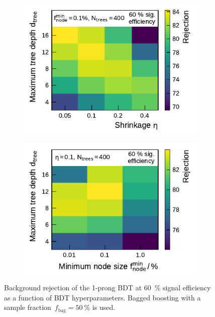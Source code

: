 \begin{figure}[htb]
\begin{subfigure}[t]{0.48\textwidth}
    \includegraphics{./figures/bdt_perf/gridsearch_1p/scan_Shrinkage_MaxDepth.pdf}
    \vspace*{-1.6em}
    \subcaption{}
    \label{fig:gridscan_shrinkage_maxdepth}
  \end{subfigure}\hfill
  \begin{subfigure}[t]{0.48\textwidth}
    \centering
    \includegraphics{./figures/bdt_perf/gridsearch_1p/scan_MinNodeSize_MaxDepth.pdf}
    \vspace*{-1.6em}
    \subcaption{}
    \label{fig:gridscan_minnodesize_maxdepth}
  \end{subfigure}
  \vspace*{-0.3em}
  \caption{Background rejection of the 1-prong BDT at \SI{60}{\percent} signal
    efficiency as a function of BDT hyperparameters. Bagged boosting with a
    sample fraction~$f_\text{bag} = \SI{50}{\percent}$ is used.}
  \label{fig:hyperparameter_scan_1p}
\end{figure}

